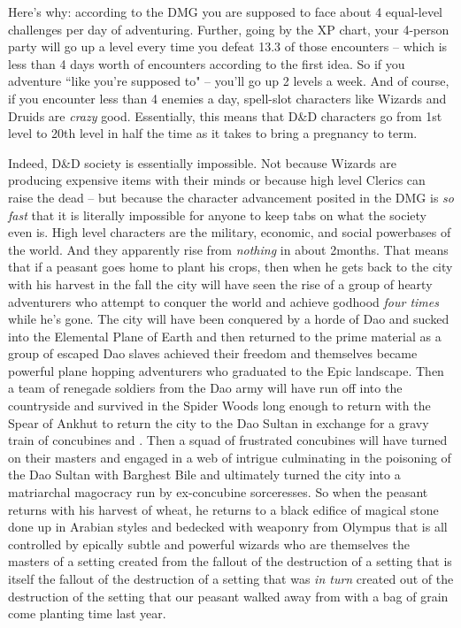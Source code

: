 Here's why: according to the DMG you are supposed to face about 4 equal-level challenges per day of adventuring. Further, going by the XP chart, your 4-person party will go up a level every time you defeat 13.3 of those encounters -- which is less than 4 days worth of encounters according to the first idea. So if you adventure ``like you're supposed to" -- you'll go up 2 levels a week. And of course, if you encounter less than 4 enemies a day, spell-slot characters like Wizards and Druids are \textit{crazy} good. Essentially, this means that D\&D characters go from 1st level to 20th level in half the time as it takes to bring a pregnancy to term.

Indeed, D\&D society is essentially impossible. Not because Wizards are producing expensive items with their minds or because high level Clerics can raise the dead -- but because the character advancement posited in the DMG is \textit{so fast} that it is literally impossible for anyone to keep tabs on what the society even is. High level characters are the military, economic, and social powerbases of the world. And they apparently rise from \textit{nothing} in about 2\half months. That means that if a peasant goes home to plant his crops, then when he gets back to the city with his harvest in the fall the city will have seen the rise of a group of hearty adventurers who attempt to conquer the world and achieve godhood \textit{four times} while he's gone. The city will have been conquered by a horde of Dao and sucked into the Elemental Plane of Earth and then returned to the prime material as a group of escaped Dao slaves achieved their freedom and themselves became powerful plane hopping adventurers who graduated to the Epic landscape. Then a team of renegade soldiers from the Dao army will have run off into the countryside and survived in the Spider Woods long enough to return with the Spear of Ankhut to return the city to the Dao Sultan in exchange for a gravy train of concubines and . Then a squad of frustrated concubines will have turned on their masters and engaged in a web of intrigue culminating in the poisoning of the Dao Sultan with Barghest Bile and ultimately turned the city into a matriarchal magocracy run by ex-concubine sorceresses. So when the peasant returns with his harvest of wheat, he returns to a black edifice of magical stone done up in Arabian styles and bedecked with weaponry from Olympus that is all controlled by epically subtle and powerful wizards who are themselves the masters of a setting created from the fallout of the destruction of a setting that is itself the fallout of the destruction of a setting that was \textit{in turn} created out of the destruction of the setting that our peasant walked away from with a bag of grain come planting time last year.

